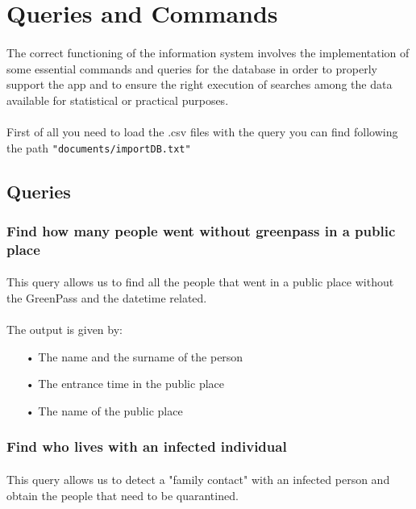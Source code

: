 \documentclass[a4paper,12pt]{article}
\begin{document}
\section{Queries and Commands}
\paragraph{} The correct functioning of the information system involves the implementation of some essential commands and queries for the database in order to properly support the app and to ensure the right execution of searches among the data available for statistical or practical purposes. \par
\paragraph{} First of all you need to load the .csv files with the query you can find following the path \texttt{"documents/importDB.txt"}
\subsection{Queries}
\subsubsection{Find how many people went without greenpass in a public place}
\paragraph{} This query allows us to find all the people that went in a public place without the GreenPass and the datetime related.

\paragraph{} The output is given by: 
\begin{itemize}
\item[•] The name and the surname of the person
\item[•] The entrance time in the public place
\item[•] The name of the public place
\end{itemize}
\clearpage
\subsubsection{Find who lives with an infected individual}
\paragraph{} This query allows us to detect a "family contact" with an infected person and obtain the people that need to be quarantined.
\end{document}
